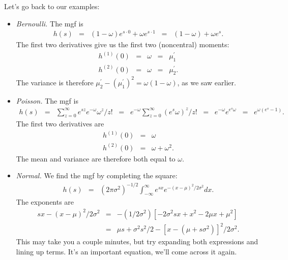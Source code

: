 \documentclass[11pt]{article}
\begin{document}
Let's go back to our examples:
%
\begin{itemize}
\item {\it Bernoulli.\/}
The mgf is
\begin{eqnarray*}
    h(s) &=& (1-\omega) e^{s \cdot 0} + \omega e^{s \cdot 1}
        \;\;=\;\; (1-\omega) + \omega e^{s} .
\end{eqnarray*}
The first two derivatives give us the first two (noncentral) moments:
\begin{eqnarray*}
    h^{(1)}(0) &=& \omega \;\;=\;\; \mu_1^\prime \\
    h^{(2)}(0) &=& \omega \;\;=\;\; \mu_2^\prime.
\end{eqnarray*}
The variance is therefore $\mu_2^\prime - (\mu_1^\prime)^2 = \omega (1-\omega)$, as we saw earlier.

\item {\it Poisson.\/}  The mgf is
\begin{eqnarray*}
    h(s) &=& \sum_{z=0}^\infty e^{sz} e^{-\omega} \omega^z/z!
            \;\;=\;\; e^{-\omega} \sum_{z=0}^\infty \left( e^{s} \omega\right)^z /z!
            \;\;=\;\; e^{-\omega} e^{e^{s} \omega}
            \;\;=\;\; e^{\omega (e^{s}-1)}  .
\end{eqnarray*}
The first two derivatives are
\begin{eqnarray*}
    h^{(1)}(0) &=& \omega  \\
    h^{(2)}(0) &=& \omega + \omega^2 .
\end{eqnarray*}
The mean and variance are therefore both equal to $\omega$.

\item {\it Normal.\/}
We find the mgf by completing the square:
\begin{eqnarray*}
        h(s) &=& (2\pi \sigma^2)^{-1/2} \int_{-\infty}^\infty e^{sx} e^{-(x-\mu)^2/2\sigma^2} dx .
\end{eqnarray*}
The exponents are
\begin{eqnarray}
        sx - (x-\mu)^2/2\sigma^2 &=&
                -(1/2\sigma^2) \left[ -2 \sigma^2 s x + x^2 - 2 \mu x + \mu^2  \right] 
                        \nonumber \\
            &=& \mu s + \sigma^2 s^2/2 - [x-(\mu+s \sigma^2)]^2/2\sigma^2 .
            \label{eq:complete-the-square}
\end{eqnarray}
This may take you a couple minutes,  but try expanding both expressions and lining up terms.
It's an important equation, we'll come across it again.  


\end{itemize}
\end{document}
